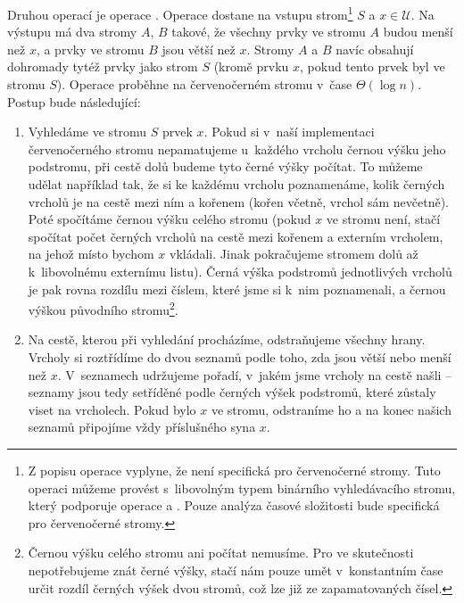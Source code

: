 Druhou operací je operace . Operace  dostane na vstupu
strom\footnote{Z popisu operace  vyplyne, že není specifická pro
červenočerné stromy. Tuto operaci můžeme provést s~libovolným typem binárního
vyhledávacího stromu, který podporuje operace  a . Pouze
analýza časové složitosti bude specifická pro červenočerné stromy.} $S$ a $x\in
\mathcal U$. Na výstupu má dva stromy $A$, $B$ takové, že všechny prvky ve
stromu $A$ budou menší než $x$, a prvky ve stromu $B$ jsou větší než $x$.
Stromy $A$ a $B$ navíc obsahují dohromady tytéž prvky jako strom $S$ (kromě
prvku $x$, pokud tento prvek byl ve stromu $S$). Operace  proběhne
na červenočerném stromu v~čase $\Theta(\log n)$. Postup bude následující:

\begin{enumerate}

\item Vyhledáme ve stromu $S$ prvek $x$. Pokud si v~naší implementaci
červenočerného stromu nepamatujeme u~každého vrcholu černou výšku jeho
podstromu, při cestě dolů budeme tyto černé výšky počítat. To můžeme udělat
například tak, že si ke každému vrcholu poznamenáme, kolik černých vrcholů je
na cestě mezi ním a kořenem (kořen včetně, vrchol sám nevčetně). Poté spočítáme
černou výšku celého stromu (pokud $x$ ve stromu není, stačí spočítat počet
černých vrcholů na cestě mezi kořenem a externím vrcholem, na jehož místo
bychom $x$ vkládali. Jinak pokračujeme stromem dolů až k~libovolnému externímu
listu). Černá výška podstromů jednotlivých vrcholů je pak rovna rozdílu mezi číslem,
které jsme si k~nim poznamenali, a černou výškou původního
stromu\footnote{Černou výšku celého stromu ani počítat nemusíme.
Pro  ve skutečnosti nepotřebujeme znát černé výšky, stačí nám pouze umět
v~konstantním čase určit rozdíl černých výšek dvou stromů, což lze již ze
zapamatovaných čísel.}.

\item Na cestě, kterou při vyhledání procházíme, odstraňujeme všechny hrany.
Vrcholy si roztřídíme do dvou seznamů podle toho, zda jsou větší nebo menší než
$x$. V~seznamech udržujeme pořadí, v~jakém jsme vrcholy na cestě našli --
seznamy jsou tedy setříděné podle černých výšek podstromů, které zůstaly viset na
vrcholech. Pokud bylo $x$ ve stromu, odstraníme ho a na konec našich seznamů
připojíme vždy příslušného syna $x$.


\end{enumerate}
